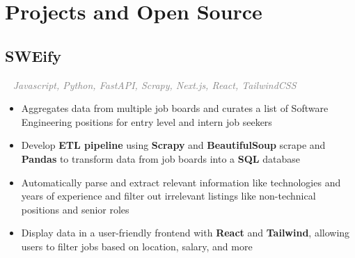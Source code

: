 \documentclass{article}
\newcommand{\projectsection}[3]{
    \subsection*{#1}
    \ 
    \small
    \textcolor{grey}{\emph{#2}}
    \normalsize
    \hfill
    \textcolor{black}{#3}
    \small
}
\begin{document}
\section*{Projects and Open Source}
\projectsection{SWEify}{Javascript, Python, FastAPI, Scrapy, Next.js, React, TailwindCSS}{}
\begin{itemize}
    \item Aggregates data from multiple job boards and curates a list of Software Engineering positions for entry level and intern job seekers
    \item Develop \textbf{ETL pipeline} using \textbf{Scrapy} and \textbf{BeautifulSoup} scrape and \textbf{Pandas} to transform data from job boards into a \textbf{SQL} database
    \item Automatically parse and extract relevant information like technologies and years of experience and filter out irrelevant listings like non-technical positions and senior roles
    \item Display data in a user-friendly frontend with \textbf{React} and \textbf{Tailwind}, allowing users to filter jobs based on location, salary, and more
\end{itemize}
\end{document}
